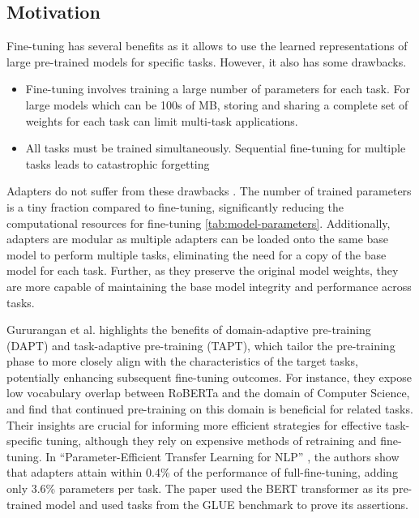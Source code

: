 \documentclass[draft,10pt,twocolumn,letterpaper]{article}
\begin{document}
\subsection{Motivation}  Fine-tuning has several benefits as it allows to use the learned representations of large pre-trained models for specific tasks. However, it also has some
drawbacks.

\begin{itemize}
    \item Fine-tuning involves training a large number of parameters for each task. For large models which can be 100s of MB, storing and sharing a complete set of weights for each task can limit multi-task applications.
    \item All tasks must be trained simultaneously. Sequential fine-tuning for multiple tasks leads to catastrophic forgetting \cite{mccloskey1989catastrophic}
\end{itemize}
Adapters do not suffer from these drawbacks \cite{houlsby2019parameter}. The number of trained parameters is a tiny fraction compared to fine-tuning, significantly reducing the computational resources for fine-tuning \ref{tab:model-parameters}. Additionally, adapters are modular as multiple adapters can be loaded onto the same base model to perform multiple tasks, eliminating the need for a copy of the base model for each task. Further, as they preserve the original model weights, they are more capable of maintaining the base model integrity and performance across tasks.

Gururangan et al. \cite{gururangan2020dont} highlights the benefits of domain-adaptive pre-training (DAPT) and task-adaptive pre-training (TAPT), which tailor the pre-training phase to more closely align with the characteristics of the target tasks, potentially enhancing subsequent fine-tuning outcomes. For instance, they expose low vocabulary overlap between RoBERTa and the domain of Computer Science, and find that continued pre-training on this domain is beneficial for related tasks. Their insights are crucial for informing more efficient strategies for effective task-specific tuning, although they rely on expensive methods of retraining and fine-tuning. In “Parameter-Efficient Transfer Learning for NLP” \cite{houlsby2019parameter}, the authors show that adapters attain within 0.4\% of the performance of full-fine-tuning, adding only 3.6\% parameters per task. The paper used the BERT transformer as its pre-trained model and used tasks from the GLUE benchmark to prove its assertions. 
\end{document}
